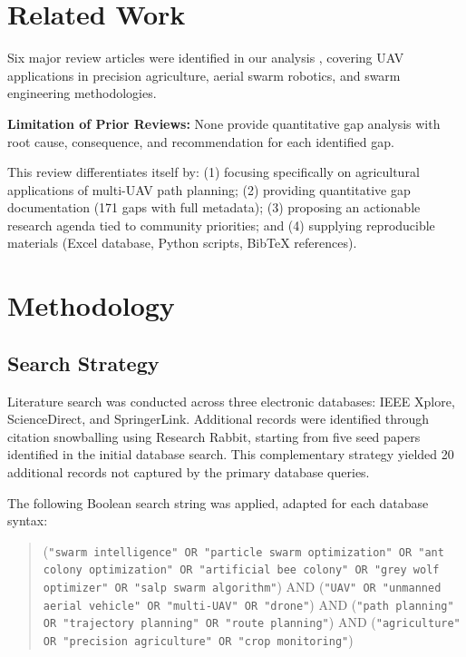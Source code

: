 \documentclass[review, 12pt, times]{elsarticle}
\begin{document}
\section{Related Work}

Six major review articles were identified in our analysis
\cite{tsouros2019,mogili2018,chung2018,gupta2016,%
brambilla2013,bayindir2016}, covering UAV applications in
precision agriculture, aerial swarm robotics, and swarm
engineering methodologies.

\textbf{Limitation of Prior Reviews:} None provide
quantitative gap analysis with root cause, consequence,
and recommendation for each identified gap.

This review differentiates itself by: (1) focusing
specifically on agricultural applications of multi-UAV
path planning; (2) providing quantitative gap documentation
(171 gaps with full metadata); (3) proposing an actionable
research agenda tied to community priorities; and (4)
supplying reproducible materials (Excel database, Python
scripts, BibTeX references).

\section{Methodology}

\subsection{Search Strategy}

Literature search was conducted across three electronic
databases: IEEE Xplore, ScienceDirect, and SpringerLink.
Additional records were identified through citation
snowballing using Research Rabbit, starting from five seed
papers identified in the initial database search. This
complementary strategy yielded 20 additional records not
captured by the primary database queries.

The following Boolean search string was applied, adapted
for each database syntax:

\begin{quote}
(\texttt{"swarm intelligence" OR "particle swarm
optimization" OR "ant colony optimization" OR "artificial
bee colony" OR "grey wolf optimizer" OR "salp swarm
algorithm"}) AND (\texttt{"UAV" OR "unmanned aerial vehicle"
OR "multi-UAV" OR "drone"}) AND (\texttt{"path planning" OR
"trajectory planning" OR "route planning"}) AND
(\texttt{"agriculture" OR "precision agriculture" OR
"crop monitoring"})
\end{quote}
\end{document}
